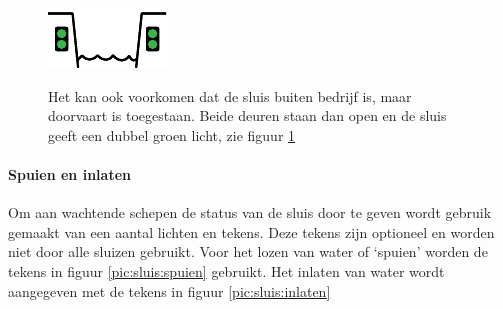 \vspace{-0.35cm}
\begin{figure}[H]
	\centering
	\begin{minipage}[b]{0.18\textwidth}	
		\includegraphics[width=\textwidth]{Hoofdstukken/Bruggen/pdf/sluis_buiten_dienst_open.pdf}
		\caption{}
		\label{pic:sluis:buiten_toegestaan}
	\end{minipage}
	\hfill
	\begin{minipage}[t]{0.75\textwidth}
		\vspace{-2cm}
		Het kan ook voorkomen dat de sluis buiten bedrijf is, maar doorvaart is toegestaan. Beide deuren staan dan open en de sluis geeft een dubbel groen licht, zie figuur \ref{pic:sluis:buiten_toegestaan}
	\end{minipage}
\end{figure}
\paragraph{Spuien en inlaten}
Om aan wachtende schepen de status van de sluis door te geven wordt gebruik gemaakt van een aantal lichten en tekens. Deze tekens zijn optioneel en worden niet door alle sluizen gebruikt. Voor het lozen van water of `spuien' worden de tekens in figuur \ref{pic:sluis:spuien} gebruikt. Het inlaten van water wordt aangegeven met de tekens in figuur \ref{pic:sluis:inlaten}

